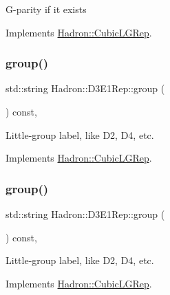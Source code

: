 G-\/parity if it exists 

Implements \mbox{\hyperlink{structHadron_1_1CubicLGRep_ace26f7b2d55e3a668a14cb9026da5231}{Hadron\+::\+Cubic\+L\+G\+Rep}}.

\mbox{\label{structHadron_1_1D3E1Rep_abb8515fbdd1dceea33a5f4af036f31eb}} 
\subsubsection{\texorpdfstring{group()}{group()}\hspace{0.1cm}{\footnotesize\ttfamily [1/5]}}
{\footnotesize\ttfamily std\+::string Hadron\+::\+D3\+E1\+Rep\+::group (\begin{DoxyParamCaption}{ }\end{DoxyParamCaption}) const\hspace{0.3cm}{\ttfamily [inline]}, {\ttfamily [virtual]}}

Little-\/group label, like D2, D4, etc. 

Implements \mbox{\hyperlink{structHadron_1_1CubicLGRep_a9bdb14b519a611d21379ed96a3a9eb41}{Hadron\+::\+Cubic\+L\+G\+Rep}}.

\mbox{\label{structHadron_1_1D3E1Rep_abb8515fbdd1dceea33a5f4af036f31eb}} 
\subsubsection{\texorpdfstring{group()}{group()}\hspace{0.1cm}{\footnotesize\ttfamily [2/5]}}
{\footnotesize\ttfamily std\+::string Hadron\+::\+D3\+E1\+Rep\+::group (\begin{DoxyParamCaption}{ }\end{DoxyParamCaption}) const\hspace{0.3cm}{\ttfamily [inline]}, {\ttfamily [virtual]}}

Little-\/group label, like D2, D4, etc. 

Implements \mbox{\hyperlink{structHadron_1_1CubicLGRep_a9bdb14b519a611d21379ed96a3a9eb41}{Hadron\+::\+Cubic\+L\+G\+Rep}}.

\mbox{\label{structHadron_1_1D3E1Rep_abb8515fbdd1dceea33a5f4af036f31eb}} 
